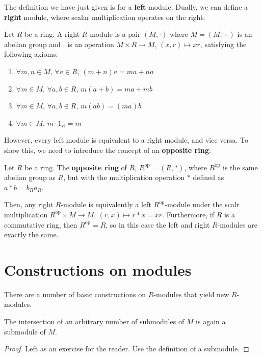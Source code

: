 \documentclass[12pt, a4paper, titlepage]{report}
\newcommand\opp[1]{{#1}^{\mathrm{op}}}
\begin{document}
The definition we have just given is for a \textbf{left} module. Dually, we can define a \textbf{right} module, where scalar
multiplication operates on the right:

\begin{defn}
  Let $R$ be a ring. A right $R$-module is a pair $(M, \cdot)$ where $M = (M, +)$ is an abelian group
  and $\cdot$ is an operation $M \times R \rightarrow M$, $(x, r) \mapsto xr$, satisfying the
  following axioms:
  \begin{enumerate}
  \item $\forall m, n \in M$, $\forall a \in R$, $(m + n)a = ma + na$
  \item $\forall m \in M$, $\forall a, b \in R$, $m(a + b) = ma + mb$
  \item $\forall m \in M$, $\forall a, b \in R$, $m(ab) = (ma)b$
  \item $\forall m \in M$, $m \cdot 1_{R} = m$
  \end{enumerate}
\end{defn}

However, every left module is equivalent to a right module, and vice versa. To show this, we need to introduce the concept of an
\textbf{opposite ring}:

\begin{defn}
  Let $R$ be a ring. The \textbf{opposite ring} of $R$, $\opp{R} = (R, \ast)$, where $\opp{R}$ is the same abelian group as $R$, but with the
  multiplication operation $\ast$ defined as $a \ast b = b_Ra_R$.
\end{defn}

Then, any right $R$-module is equivalently a left $\opp{R}$-module under the scalr multiplication $\opp{R} \times M \rightarrow M$,
$(r, x) \mapsto r * x = xr$.
Furthermore, if $R$ is a commutative ring, then $\opp{R} = R$, so in this case the left and right $R$-modules are exactly the same.

\section{Constructions on modules}

There are a number of basic constructions on $R$-modules that yield new $R$-modules.

\begin{thm}
  The intersection of an arbitrary number of submodules of $M$ is again a submodule of $M$.
\end{thm}

\begin{proof}
  Left as an exercise for the reader. Use the definition of a submodule.
\end{proof}
\end{document}
